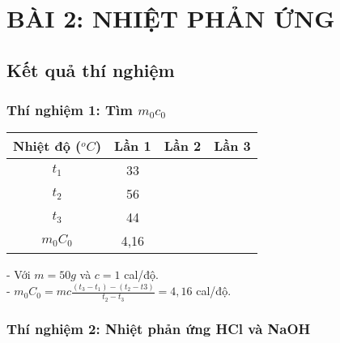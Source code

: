 \chapter{BÀI 2: NHIỆT PHẢN ỨNG}

   \section{Kết quả thí nghiệm}
   
      \subsection{Thí nghiệm 1: Tìm \textbf{$m_{0}c_{0}$}}
      
         \begin{center}
            \begin{tabular}{|c|c|c|c|}
               \hline \textbf{Nhiệt độ ($ ^{o}C$)}&\textbf{Lần 1}&\textbf{Lần 2}&\textbf{Lần 3}\\
               \hline \textbf{$t_{1}$}&33&&\\
               \hline \textbf{$t_{2}$}&56&&\\
               \hline \textbf{$t_{3}$}&44&&\\
               \hline \textbf{$m_{0}C_{0}$}&4,16&&\\
               \hline
            \end{tabular}
         \end{center}
         - Với $m = 50g$ và $c = 1$ cal/độ.\\
         - $m_{0}C_{0} = mc\frac{(t_{3}-t_{1})-(t_{2}-t{3})}{t_{2}-t_{3}} = 4,16$ cal/độ. 
         
      \subsection{Thí nghiệm 2: Nhiệt phản ứng HCl và NaOH}
      
